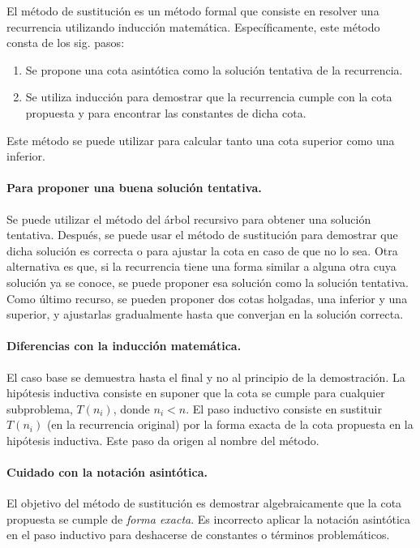 El método de sustitución es un método formal que consiste en resolver una recurrencia utilizando inducción matemática. 
Específicamente, este método consta de los sig. pasos:
\begin{enumerate}
  \item Se propone una cota asintótica como la solución tentativa de la recurrencia.
  \item Se utiliza inducción para demostrar que la recurrencia cumple con la cota propuesta y para encontrar las constantes de dicha cota.
\end{enumerate}
Este método se puede utilizar para calcular tanto una cota superior como una inferior.

\paragraph{Para proponer una buena solución tentativa.}{%
  Se puede utilizar el método del árbol recursivo para obtener una solución tentativa.
  Después, se puede usar el método de sustitución para demostrar que dicha solución es correcta o para ajustar la cota en caso de que no lo sea.
  Otra alternativa es que, si la recurrencia tiene una forma similar a alguna otra cuya solución ya se conoce, se puede proponer esa solución como la solución tentativa.
  Como último recurso, se pueden proponer dos cotas holgadas, una inferior y  una superior, y ajustarlas gradualmente hasta que converjan en la solución correcta. 
}
\paragraph{Diferencias con la inducción matemática.}{%
  El caso base se demuestra hasta el final y no al principio de la demostración.
  La hipótesis inductiva consiste en suponer que la cota se cumple para cualquier subproblema, \(T(n_i)\), donde \(n_i<n\). 
  El paso inductivo consiste en sustituir \(T(n_i)\) (en la recurrencia original) por la forma exacta de la cota propuesta en la hipótesis inductiva. 
  Este paso da origen al nombre del método.
}
\paragraph{Cuidado con la notación asintótica.} {%
  El objetivo del método de sustitución es demostrar algebraicamente que 
  la cota propuesta se cumple de \emph{forma exacta}.
  Es incorrecto aplicar la notación asintótica en el paso inductivo para deshacerse de constantes o términos problemáticos.
}

